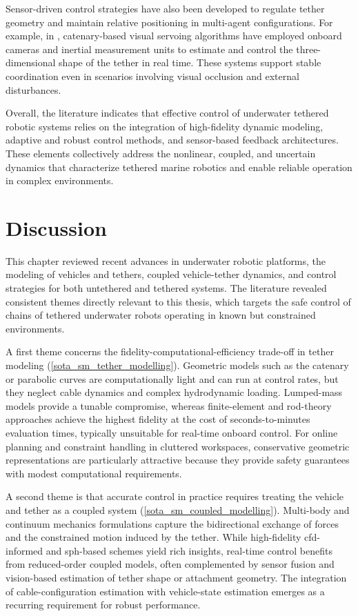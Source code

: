 Sensor-driven control strategies have also been developed to regulate tether geometry and maintain
relative positioning in multi-agent configurations. For example, in
\cite{laranjeiraCatenarybasedVisualServoing2020}, catenary-based visual servoing algorithms have
employed onboard cameras and inertial measurement units to estimate and control the
three-dimensional shape of the tether in real time. These systems support stable coordination even
in scenarios involving visual occlusion and external disturbances.

Overall, the literature indicates that effective control of underwater tethered robotic systems
relies on the integration of high-fidelity dynamic modeling, adaptive and robust control methods,
and sensor-based feedback architectures. These elements collectively address the nonlinear,
coupled, and uncertain dynamics that characterize tethered marine robotics and enable reliable
operation in complex environments.

\section{Discussion}
\label{sota_discussion}

This chapter reviewed recent advances in underwater robotic platforms, the modeling of vehicles and
tethers, coupled vehicle-tether dynamics, and control strategies for both untethered and tethered
systems. The literature revealed consistent themes directly relevant to this thesis, which targets
the safe control of chains of tethered underwater robots operating in known but constrained
environments.

A first theme concerns the fidelity-computational-efficiency trade-off in tether modeling
(\cref{sota_sm_tether_modelling}). Geometric models such as the catenary or parabolic curves are
computationally light and can run at control rates, but they neglect cable dynamics and complex
hydrodynamic loading. Lumped-mass models provide a tunable compromise, whereas finite-element and
rod-theory approaches achieve the highest fidelity at the cost of seconds-to-minutes evaluation
times, typically unsuitable for real-time onboard control. For online planning and constraint
handling in cluttered workspaces, conservative geometric representations are particularly
attractive because they provide safety guarantees with modest computational requirements.

A second theme is that accurate control in practice requires treating the vehicle and tether as a
coupled system (\cref{sota_sm_coupled_modelling}). Multi-body and continuum mechanics formulations
capture the bidirectional exchange of forces and the constrained motion induced by the tether.
While high-fidelity \ac{cfd}-informed and \ac{sph}-based schemes yield rich insights, real-time
control benefits from reduced-order coupled models, often complemented by sensor fusion and
vision-based estimation of tether shape or attachment geometry. The integration of
cable-configuration estimation with vehicle-state estimation emerges as a recurring requirement for
robust performance.

